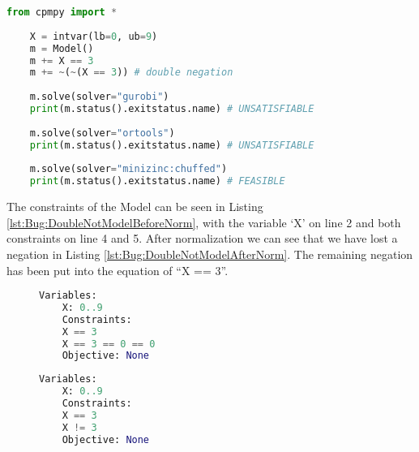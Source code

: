 \begin{lstlisting}[language=python, label={lst:Bug:DoubleNot}, caption={The “double negation”-bug.}]
	from cpmpy import *
	
	X = intvar(lb=0, ub=9)
	m = Model()
	m += X == 3
	m += ~(~(X == 3)) # double negation 
	
	m.solve(solver="gurobi")
	print(m.status().exitstatus.name) # UNSATISFIABLE
	
	m.solve(solver="ortools")
	print(m.status().exitstatus.name) # UNSATISFIABLE
	
	m.solve(solver="minizinc:chuffed")
	print(m.status().exitstatus.name) # FEASIBLE	
\end{lstlisting}

The constraints of the Model can be seen in Listing \ref{lst:Bug:DoubleNotModelBeforeNorm}, with the variable ‘X’ on line 2 and both constraints on line 4 and 5. After normalization we can see that we have lost a negation in Listing \ref{lst:Bug:DoubleNotModelAfterNorm}. The remaining negation has been put into the equation of “X == 3”.

\begin{figure}[h]
	\begin{minipage}{0.5\textwidth}
		\centering
\begin{lstlisting}[language=python, label={lst:Bug:DoubleNotModelBeforeNorm}, caption={The constraints of the “double negation”-bug \emph{before} the normalization process.}]
	Variables:
	X: 0..9
	Constraints:
	X == 3
	X == 3 == 0 == 0
	Objective: None
\end{lstlisting}
	\end{minipage}
	\begin{minipage}{0.5\textwidth}
		\centering
\begin{lstlisting}[language=python, label={lst:Bug:DoubleNotModelAfterNorm}, caption={The resulting constraints of the “double negation”-bug \emph{after} the normalization process.}]
	Variables:
	X: 0..9
	Constraints:
	X == 3
	X != 3
	Objective: None
\end{lstlisting}
	\end{minipage}
\end{figure}



